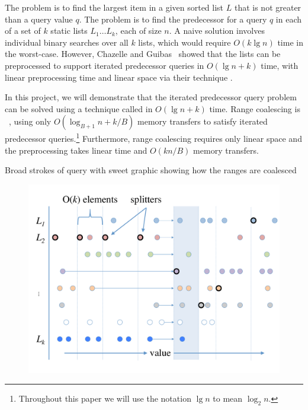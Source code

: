 
The  problem is to find the largest item in a given sorted list $L$
that is not greater than a query value $q$.  The  
problem is to find the predecessor for a query $q$ in each of a set of $k$ static lists
$L_1 \ldots L_k$, each of size $n$.  A naive solution involves individual binary searches over all
$k$ lists, which would require $O(k \lg n)$ time in the worst-case.  However, Chazelle
and Guibas~\cite{ChazelleGu86a} showed that the lists can be 
preprocessed to support iterated predecessor queries in $O(\lg n + k)$ time, with
linear preprocessing time and linear space via their technique .

In this project, we will demonstrate that the iterated predecessor query problem
can be solved using a technique called  in $O(\lg n + k)$ time.
Range coalescing is ~\cite{FrigoLePr99}, using only 
$O(\log_{B+1} n + k/B)$ memory transfers to satisfy iterated predecessor
queries.\footnote{Throughout this paper we will use the notation $\lg n$ to mean
$\log_2 n$.}  Furthermore, range coalescing requires
only linear space and the preprocessing takes linear time and $O(kn/B)$ memory
transfers.

Broad strokes of query with sweet graphic showing how the ranges are coalesced

\begin{figure}[h]
\includegraphics[scale=.3]{cache-oblivious-fractional-cascading-a.pdf}
\caption{}
\label{fig:range_coalescing} 
\end{figure}

